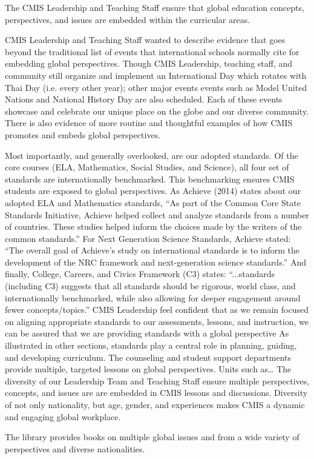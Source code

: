 \documentclass{report}
\begin{document}
\begin{findings}
The CMIS Leadership and Teaching Staff ensure that global education concepts, perspectives, and issues are embedded within the curricular areas.

CMIS Leadership and Teaching Staff wanted to describe evidence that goes beyond the traditional list of events that international schools normally cite for embedding global perspectives. Though CMIS Leadership, teaching staff, and community still organize and implement an International Day which rotates with Thai Day (i.e. every other year); other major events events such as Model United Nations and National History Day are also scheduled. Each of these events showcase and celebrate our unique place on the globe and our diverse community. There is also evidence of more routine and thoughtful examples of how CMIS promotes and embeds global perspectives. 

Most importantly, and generally overlooked, are our adopted standards. Of the core courses (ELA, Mathematics, Social Studies, and Science), all four set of standards are internationally benchmarked. This benchmarking  ensures CMIS students are exposed to global perspectives. As Achieve (2014) states about our adopted ELA and Mathematics standards, 
“As part of the Common Core State Standards Initiative, Achieve helped collect and analyze standards from a number of countries. These studies helped inform the choices made by the writers of the common standards.”
For Next Generation Science Standards, Achieve stated: 
“The overall goal of Achieve’s study on international standards is to inform the development of the NRC framework and next-generation science standards.”
And finally, College, Careers, and Civics Framework (C3) states: 
“...standards (including C3) suggests that all standards should be rigorous, world class, and internationally benchmarked, while also allowing for deeper engagement around fewer concepts/topics.” 
CMIS Leadership feel confident that as we remain focused on aligning appropriate standards to our assessments, lessons, and instruction, we can be assured that we are providing standards with a global perspective 
As illustrated in other sections, standards play a central role in planning, guiding, and developing curriculum. 
The counseling and student support departments provide multiple, targeted lessons on global perspectives. Units such as…
The diversity of our Leadership Team and Teaching Staff ensure multiple perspectives, concepts, and issues are are embedded in CMIS lessons and discussions. Diversity of not only nationality, but age, gender, and experiences makes CMIS a dynamic and engaging global workplace. 

The library provides books on multiple global issues and from a wide variety of perspectives and diverse nationalities.
\end{findings}
\end{document}
